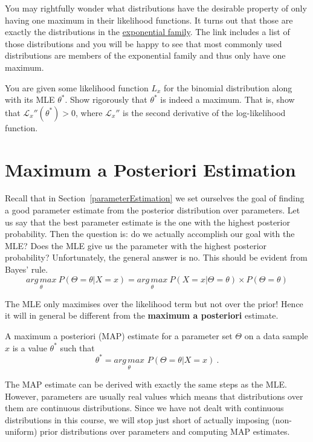 You may rightfully wonder what distributions have the desirable property of only having one maximum in their likelihood functions. It turns out that those are
exactly the distributions in the \href{https://en.wikipedia.org/wiki/Exponential_family}{exponential family}. The link includes a list of those distributions and
you will be happy to see that most commonly used distributions are members of the exponential family and thus only have one maximum.

\begin{Exercise}
You are given some likelihood function $ L_{x} $ for the binomial distribution along with its MLE $ \theta^{*} $. Show rigorously that $ \theta^{*} $ is indeed
a maximum. That is, show that $ \mathcal{L}_{x}''(\theta^{*}) > 0 $, where $ \mathcal{L}_{x}'' $ is the second derivative of the log-likelihood function.
\end{Exercise}

 
\section{Maximum a Posteriori Estimation}

Recall that in Section~\ref{parameterEstimation} we set ourselves the goal of finding a good parameter estimate from the posterior distribution over parameters.
Let us say that the best parameter estimate is the one with the highest posterior probability. Then the question is: do we actually accomplish our goal with the MLE?
Does the MLE give us the parameter with the highest posterior probability? Unfortunately, the general answer is no. This should be evident from Bayes' rule.
\begin{equation}
\underset{\theta}{arg\,max}~P(\Theta = \theta| X=x) = \underset{\theta}{arg\,max}~P(X=x|\Theta=\theta) \times P(\Theta = \theta)
\end{equation}

The MLE only maximises over the likelihood term but not over the prior! Hence it will in general be different from the \textbf{maximum a posteriori} estimate.

\begin{Definition}
A maximum a posteriori (MAP) estimate for a parameter set $ \Theta $ on a data sample $ x $ 
is a value $ \theta^{*} $ such that
$$ \theta^{*} = \underset{\theta}{arg\,max}\, \, P(\Theta = \theta| X=x) \ . $$
\end{Definition}

The MAP estimate can be derived with exactly the same steps as the MLE. However, parameters are usually real values which means that distributions over them
are continuous distributions. Since we have not dealt with continuous distributions in this course, we will stop just short of actually imposing
(non-uniform) prior distributions over parameters and computing MAP estimates.

